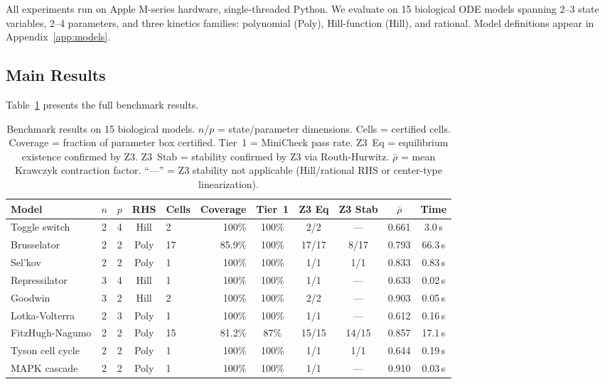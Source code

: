 \documentclass[11pt]{article}
\begin{document}
All experiments run on Apple M-series hardware, single-threaded Python.
We evaluate on 15 biological ODE models spanning 2--3 state variables, 2--4 parameters, and three kinetics families: polynomial (Poly), Hill-function (Hill), and rational.
Model definitions appear in Appendix~\ref{app:models}.

\subsection{Main Results}

Table~\ref{tab:benchmarks} presents the full benchmark results.

\begin{table}[t]
\centering
\caption{Benchmark results on 15 biological models. $n$/$p$ = state/parameter dimensions. Cells = certified cells. Coverage = fraction of parameter box certified. Tier~1 = MiniCheck pass rate. Z3~Eq = equilibrium existence confirmed by Z3. Z3~Stab = stability confirmed by Z3 via Routh-Hurwitz.  $\bar\rho$ = mean Krawczyk contraction factor. ``---'' = Z3 stability not applicable (Hill/rational RHS or center-type linearization).}
\label{tab:benchmarks}
\small
\begin{tabular}{@{}lccclrccccc@{}}
\toprule
Model & $n$ & $p$ & RHS & Cells & Coverage & Tier~1 & Z3 Eq & Z3 Stab & $\bar\rho$ & Time \\
\midrule
Toggle switch      & 2 & 4 & Hill     & 2  & 100\%  & 100\% & 2/2   & ---    & 0.661 & 3.0\,s \\
Brusselator        & 2 & 2 & Poly     & 17 & 85.9\% & 100\% & 17/17 & 8/17  & 0.793 & 66.3\,s \\
Sel'kov            & 2 & 2 & Poly     & 1  & 100\%  & 100\% & 1/1   & 1/1   & 0.833 & 0.83\,s \\
Repressilator      & 3 & 4 & Hill     & 1  & 100\%  & 100\% & 1/1   & ---    & 0.633 & 0.02\,s \\
Goodwin            & 3 & 2 & Hill     & 2  & 100\%  & 100\% & 2/2   & ---    & 0.903 & 0.05\,s \\
Lotka-Volterra     & 2 & 3 & Poly     & 1  & 100\%  & 100\% & 1/1   & ---    & 0.612 & 0.16\,s \\
FitzHugh-Nagumo    & 2 & 2 & Poly     & 15 & 81.2\% & 87\%  & 15/15 & 14/15 & 0.857 & 17.1\,s \\
Tyson cell cycle   & 2 & 2 & Poly     & 1  & 100\%  & 100\% & 1/1   & 1/1   & 0.644 & 0.19\,s \\
MAPK cascade       & 2 & 2 & Poly     & 1  & 100\%  & 100\% & 1/1   & ---    & 0.910 & 0.03\,s \\

\end{tabular}
\end{table}
\end{document}
